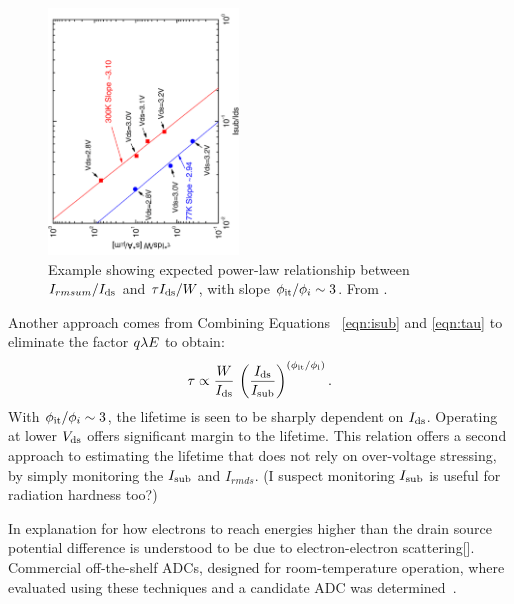 \documentclass[12pt]{article}
\begin{document}
\begin{figure}[htbp]
\begin{center}
\includegraphics[width=0.45\textwidth,angle=270]{figs/lifetime_isub.pdf} 
\caption{Example showing expected power-law relationship between $I_{rm sum}/I_{\rm ds}$ and $\tau I_{\rm ds}/W$, with slope $\phi_{\rm it}/\phi_{i} \sim 3$.  From \cite{hot-carrier-effects}.}
\label{fig:lifetime}
\end{center}
\end{figure}

Another approach comes from Combining Equations ~\ref{eqn:isub} and \ref{eqn:tau} to eliminate the factor $q \lambda E_{\rm}$ to obtain:
\begin{displaymath}
\tau \propto \frac{W}{I_{\rm ds}} \, \left( \frac{I_{\rm ds}}{I_{\rm sub}} \right)^{\left( \phi_{\rm it}/\phi_{\rm i}\right)}.
\end{displaymath}
With $\phi_{\rm it}/\phi_{i} \sim 3$, the lifetime is seen to be sharply dependent on $I_{\rm ds}$.  Operating at lower $V_{\rm ds}$ offers significant margin to the lifetime.  This relation offers a second approach to estimating the lifetime that does not rely on over-voltage stressing, by simply monitoring the $I_{\rm sub}$ and $I_{rm ds}$.  (I suspect monitoring $I_{\rm sub}$ is useful for radiation hardness too?)

In explanation for how electrons to reach energies higher than the drain source potential difference is understood to be due to electron-electron scattering[\cite{hot-carrier-effects}].  Commercial off-the-shelf ADCs, designed for room-temperature operation, where evaluated using these techniques and a candidate ADC was determined~\cite{cots-lifetime}.
\end{document}
